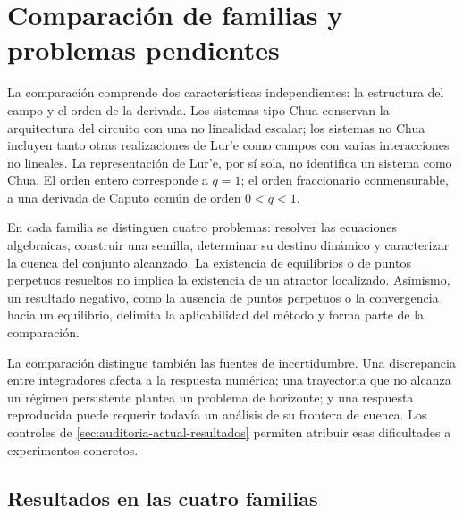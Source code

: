 \section{Comparación de familias y problemas pendientes}
\label{sec:cobertura-cuatro-familias}

La comparación comprende dos características independientes: la estructura
del campo y el orden de la derivada. Los sistemas tipo Chua conservan la
arquitectura del circuito con una no linealidad escalar; los sistemas no Chua
incluyen tanto otras realizaciones de Lur'e como campos con varias
interacciones no lineales. La representación de Lur'e, por sí sola, no
identifica un sistema como Chua. El orden entero corresponde a \(q=1\); el
orden fraccionario conmensurable, a una derivada de Caputo común de orden
\(0<q<1\).

En cada familia se distinguen cuatro problemas: resolver las ecuaciones
algebraicas, construir una semilla, determinar su destino dinámico y
caracterizar la cuenca del conjunto alcanzado. La existencia de equilibrios o
de puntos perpetuos resueltos no implica la existencia de un atractor
localizado. Asimismo, un resultado negativo, como la ausencia de puntos
perpetuos o la convergencia hacia un equilibrio, delimita la aplicabilidad
del método y forma parte de la comparación.

La comparación distingue también las fuentes de incertidumbre. Una
discrepancia entre integradores afecta a la respuesta numérica; una trayectoria
que no alcanza un régimen persistente plantea un problema de horizonte; y
una respuesta reproducida puede requerir todavía un análisis de su frontera
de cuenca. Los controles de \cref{sec:auditoria-actual-resultados} permiten
atribuir esas dificultades a experimentos concretos.

\subsection{Resultados en las cuatro familias}

